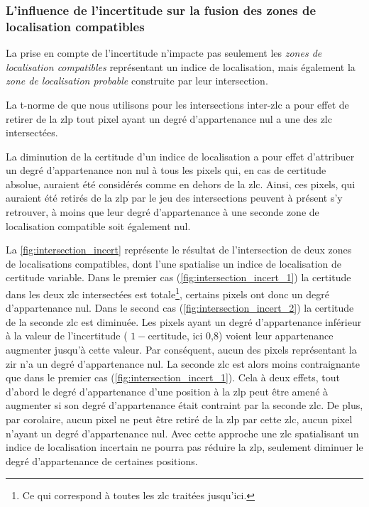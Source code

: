 \subsubsection{L'influence de l'incertitude sur la fusion des zones de
  localisation compatibles}

La prise en compte de l'incertitude n'impacte pas seulement les
\emph{zones de localisation compatibles} représentant un indice de
localisation, mais également la \emph{zone de localisation probable}
construite par leur intersection.

La t-norme de  que nous utilisons pour les intersections
inter-\ac{zlc} a pour effet de retirer de la \ac{zlp} tout pixel ayant
un degré d'appartenance nul a une des \ac{zlc} intersectées.

La diminution de la certitude d'un indice de localisation a pour effet
d'attribuer un degré d'appartenance non nul à tous les pixels qui, en
cas de certitude absolue, auraient été considérés comme en dehors de
la \ac{zlc}. Ainsi, ces pixels, qui auraient été retirés de la
\ac{zlp} par le jeu des intersections peuvent à présent s'y retrouver,
à moins que leur degré d'appartenance à une seconde zone de
localisation compatible soit également nul.

La \autoref{fig:intersection_incert} représente le résultat de
l'intersection de deux zones de localisations compatibles, dont l'une
spatialise un indice de localisation de certitude variable. Dans le
premier cas (\ref{fig:intersection_incert_1}) la certitude dans les
deux \ac{zlc} intersectées est totale\footnote{Ce qui correspond à
  toutes les \ac{zlc} traitées jusqu'ici.}, certains pixels ont donc
un degré d'appartenance nul.
%
Dans le second cas (\ref{fig:intersection_incert_2}) la certitude de
la seconde \ac{zlc} est diminuée. Les pixels ayant un degré
d'appartenance inférieur à la valeur de l'incertitude (\ie
\(1-\text{certitude}\), ici 0,8) voient leur appartenance augmenter
jusqu'à cette valeur. Par conséquent, aucun des pixels représentant la
\ac{zir} n'a un degré d'appartenance nul. La seconde \ac{zlc} est
alors moins contraignante que dans le premier cas
(\ref{fig:intersection_incert_1}). Cela à deux effets, tout d'abord le
degré d'appartenance d'une position à la \ac{zlp} peut être amené à
augmenter si son degré d'appartenance était contraint par la seconde
\ac{zlc}. De plus, par corolaire, aucun pixel ne peut être retiré de
la \ac{zlp} par cette \ac{zlc}, aucun pixel n'ayant un degré
d'appartenance nul. Avec cette approche une \ac{zlc} spatialisant un
indice de localisation incertain ne pourra pas réduire la \ac{zlp},
seulement diminuer le degré d'appartenance de certaines positions.

